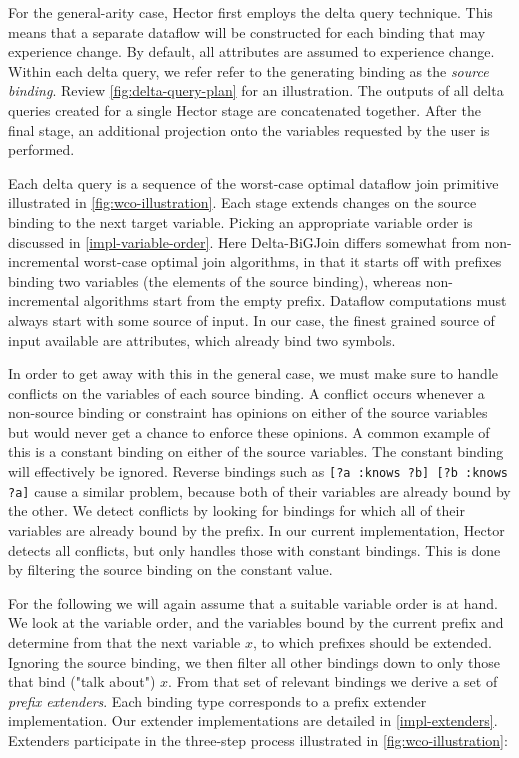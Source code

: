 \documentclass[../index.tex]{subfiles}
\begin{document}
For the general-arity case, Hector first employs the delta query
technique. This means that a separate dataflow will be constructed for
each binding that may experience change. By default, all attributes
are assumed to experience change. Within each delta query, we refer
refer to the generating binding as the \emph{source binding}. Review
\autoref{fig:delta-query-plan} for an illustration. The outputs of all
delta queries created for a single Hector stage are concatenated
together. After the final stage, an additional projection onto the
variables requested by the user is performed.

Each delta query is a sequence of the worst-case optimal dataflow join
primitive illustrated in \autoref{fig:wco-illustration}. Each stage
extends changes on the source binding to the next target
variable. Picking an appropriate variable order is discussed in
\autoref{impl-variable-order}. Here Delta-BiGJoin differs somewhat
from non-incremental worst-case optimal join algorithms, in that it
starts off with prefixes binding two variables (the elements of the
source binding), whereas non-incremental algorithms start from the
empty prefix. Dataflow computations must always start with some source
of input. In our case, the finest grained source of input available
are attributes, which already bind two symbols.

In order to get away with this in the general case, we must make sure
to handle conflicts on the variables of each source binding. A
conflict occurs whenever a non-source binding or constraint has
opinions on either of the source variables but would never get a
chance to enforce these opinions. A common example of this is a
constant binding on either of the source variables. The constant
binding will effectively be ignored. Reverse bindings such as
\texttt{[?a :knows ?b] [?b :knows ?a]} cause a similar problem,
because both of their variables are already bound by the other. We
detect conflicts by looking for bindings for which all of their
variables are already bound by the prefix. In our current
implementation, Hector detects all conflicts, but only handles those
with constant bindings. This is done by filtering the source binding
on the constant value.

For the following we will again assume that a suitable variable order
is at hand. We look at the variable order, and the variables bound by
the current prefix and determine from that the next variable $x$, to
which prefixes should be extended. Ignoring the source binding, we
then filter all other bindings down to only those that bind ("talk
about") $x$. From that set of relevant bindings we derive a set of
\emph{prefix extenders}. Each binding type corresponds to a prefix
extender implementation. Our extender implementations are detailed in
\autoref{impl-extenders}. Extenders participate in the three-step
process illustrated in \autoref{fig:wco-illustration}:
\end{document}
